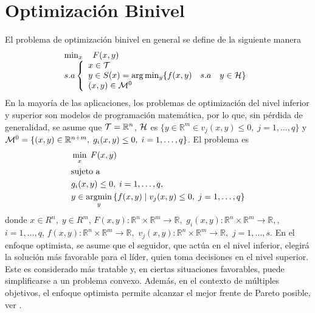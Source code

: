 \section{Optimización Binivel }
El problema de optimización binivel en general se define de la siguiente manera
\begin{equation} \label{eq:Def1Binivel}
    \begin{array}{l}
       \min_{x} \quad F(x, y)\\
        s.a \left\{ \begin{array}{l}
            x \in \cal{T} \\
             y \in S(x) = \arg  \min_{y} \{ f(x, y) \quad s.a \quad y \in  \cal{H}\}\\
            (x,y) \in {\cal{M}}^0 
        \end{array}\right.
        \end{array} \end{equation}
En la mayor\'ia de las aplicaciones, los problemas de optimización del nivel inferior y superior son modelos de programación matemática, por lo  que, sin pérdida de generalidad, se asume que  ${\cal{T}}=\mathbb{R}^n$,  $\cal{H}$ es  $\{y\in \mathbb{R}^m\in v_j(x, y)\leq 0,\;j=1,\ldots,q\}$  y
  ${\cal{M}}^0=\{(x,y)\in\mathbb{R}^{n+m},\;g_i(x, y)\leq 0,\;i=1,\ldots,q\}$. El problema es  
\begin{equation}
\begin{aligned}
& \min_{x} \; F(x, y) \\
& \text{sujeto a } \\
& g_i(x, y)\leq 0,\;i=1,\ldots,q, \\
& y \in \operatorname*{argmin}_{y} \left\{ f(x, y) \mid v_j(x, y)\leq 0,\;j=1,\ldots,q \right\}
\end{aligned}
\label{eq:ProblemaGeneral}
\end{equation}
donde 
$    x \in R^{n},\; y \in R^{m}$, $ F(x,y) : \mathbb{R}^{n} \times \mathbb{R}^{m} \to \mathbb{R},$ $ g_i(x,y)  : \mathbb{R}^{n} \times \mathbb{R}^{m} \to \mathbb{R} ,$, $i=1,\ldots, q$,  $f(x,y) : \mathbb{R}^{n} \times \mathbb{R}^{m} \to \mathbb{R},$  $v_j(x,y)  : \mathbb{R}^{n} \times \mathbb{R}^{m} \to \mathbb{R} ,$ $j=1,\ldots, s$.
En el enfoque optimista, se asume que el seguidor, que actúa en el nivel inferior, elegirá la solución más favorable para el líder, quien toma decisiones en el nivel superior. Este es considerado más tratable y, en ciertas situaciones favorables, puede simplificarse a un problema convexo. Además, en el contexto de múltiples objetivos, el enfoque optimista permite alcanzar el mejor frente de Pareto posible, ver \cite{DempeyZemkoho2020}.

